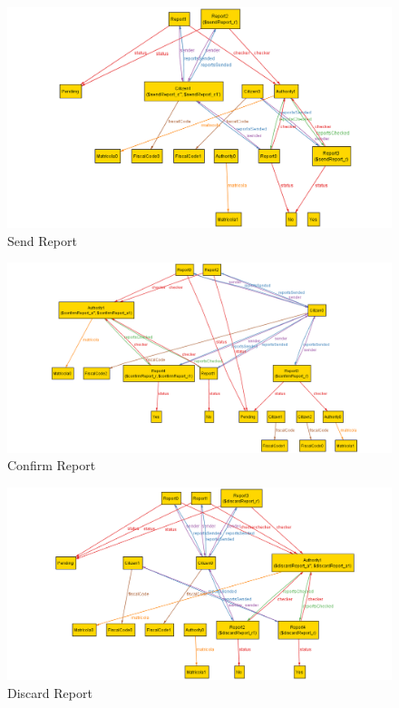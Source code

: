 \documentclass{article}
\begin{document}
\begin{figure}[H]
    \centering
    \includegraphics[scale=0.4]{img/alloy/graphical_sendReport.png}
    \caption{Send Report}
\end{figure}

\begin{figure}[H]
    \centering
    \includegraphics[scale=0.4]{img/alloy/graphical_confirmReport.png}
    \caption{Confirm Report}
\end{figure}

\begin{figure}[H]
    \centering
    \includegraphics[scale=0.4]{img/alloy/graphical_discardReport.png}
    \caption{Discard Report}
\end{figure}
\end{document}
